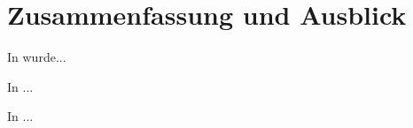 \chapter{Zusammenfassung und Ausblick}
\label{cha:zusammenfassung}
		
In  wurde... 

In  ... 

In  ... 
